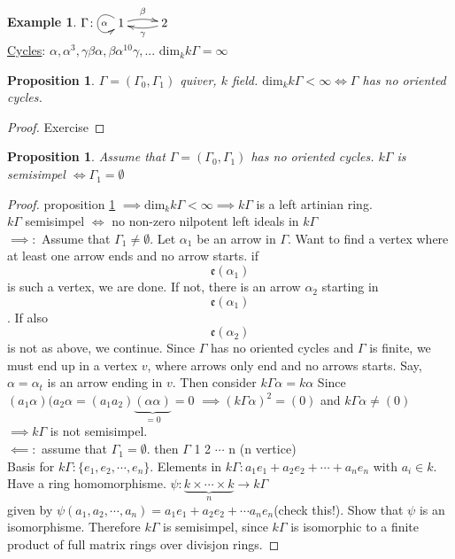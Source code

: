 \documentclass{amsart}
\numberwithin{equation}{section}
\newtheorem{prop}[thm]{Proposition}
\theoremstyle{definition}
\newtheorem{exam}[thm]{Example}
\newcommand{\G}{\Gamma}
\begin{document}
\begin{exam}
	$\G\colon \xymatrix{\ar@(ul,dl)[]^\alpha 1 \ar@/^.3pc/[r]^\beta & \ar@/^.3pc/[l]^\gamma 2}$\\ \newline
	\underline{Cycles}: $\alpha,\alpha^3,\gamma\beta\alpha,\beta\alpha^10\gamma, ...$  $\text{dim}_k k\G = \infty$ 
\end{exam}

\begin{prop}\label{prop1}
	$\G = (\G_0,\G_1)$ quiver, $k$ field. $\text{dim}_kk\G < \infty \iff \G$ has no oriented cycles.
\end{prop}

\begin{proof}
	Exercise
\end{proof}

\begin{prop}
	Assume that $\G=(\G_0,\G_1)$ has no oriented cycles. $k\G$ is semisimpel $\iff \G_1 = \emptyset$
\end{prop}

\begin{proof}
	proposition \ref{prop1} $ \implies \text{dim}_kk\G < \infty \implies k\G$ is a left artinian ring. \\
	$k\G$ semisimpel $\iff $ no non-zero nilpotent left ideals in $k\G$\\
	$\implies\colon$ Assume that $\G_1\neq\emptyset.$ Let $\alpha_1$ be an arrow in $\G$. Want to find a vertex where at least one arrow ends and no arrow starts. if \[\mathfrak{e}(\alpha_1)\] is such a vertex, we are done. If not, there is an arrow $\alpha_2$ starting in \[\mathfrak{e}(\alpha_1) \]. If also\[\mathfrak{e}(\alpha_2)\] is not as above, we continue. Since $\G$ has no oriented cycles and $\G$ is finite, we must end up in a vertex $ v$, where arrows only end and no arrows starts. Say, $\alpha = \alpha_t$ is an arrow ending in $v$. Then consider $k\G\alpha = k\alpha$ Since $(a_1\alpha)(a_2\alpha = (a_1a_2)\underbrace{(\alpha\alpha)}_{=0} = 0$ $\implies (k\G\alpha)^2=(0)$ and $k\G\alpha \neq (0)$\\
	$\implies k\G$ is not semisimpel.\\\newline
	$\impliedby\colon$ assume that $\G_1 = \emptyset$. then $\G$ 1 2 $\cdots$ n (n vertice)\\
	Basis for $k\G\colon \{e_1, e_2, \cdots, e_n\}$. Elements in $k\G\colon a_1e_1 + a_2e_2 + \cdots + a_ne_n$ with $a_i \in k$. Have a ring homomorphisme. $ \psi\colon \underbrace{k \times \cdots \times k}_{n}  \rightarrow k\G$\\
	given by $\psi(a_1,a_2,\cdots,a_n)=a_1e_1 + a_2e_2+ \cdots a_ne_n$(check this!). Show that $\psi$ is an isomorphisme. Therefore $k\G$ is semisimpel, since $k\G$ is isomorphic to a finite product of full matrix rings over divisjon rings.
\end{proof}
\end{document}
